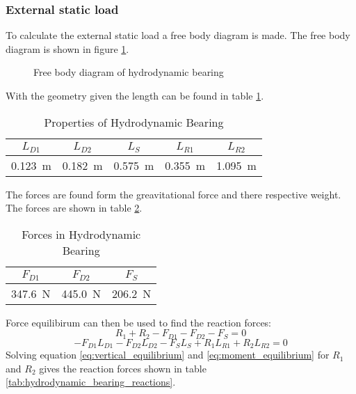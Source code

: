 \subsubsection{External static load}
To calculate the external static load a free body diagram is made. The free body diagram is shown in figure \ref{fig:free_body_diagram}.
\begin{figure}[ht]
    \centering
    
    \caption{Free body diagram of hydrodynamic bearing}
    \label{fig:free_body_diagram}
\end{figure}
With the geometry given the length can be found in table \ref{tab:hydrodynamic_bearing_properties}.
\begin{table}[ht]
    \centering
    \caption{Properties of Hydrodynamic Bearing}
    \label{tab:hydrodynamic_bearing_properties}
    \begin{tabular}{@{}ccccc@{}}
        \toprule
        $L_{D1}$    &   $L_{D2}$    &   $L_S$   &   $L_{R1}$   &   $L_{R2}$   \\ \midrule
        \SI{0.123}{\meter}  &   \SI{0.182}{\meter}  &   \SI{0.575}{\meter}   &   \SI{0.355}{\meter}   &   \SI{1.095}{\meter}   \\ \bottomrule
    \end{tabular}
\end{table}
The forces are found form the greavitational force and there respective weight. The forces are shown in table \ref{tab:hydrodynamic_bearing_forces}.
\begin{table}[ht]
    \centering
    \caption{Forces in Hydrodynamic Bearing}
    \label{tab:hydrodynamic_bearing_forces}
    \begin{tabular}{@{}ccc@{}}
        \toprule
        $F_{D1}$    &   $F_{D2}$    &   $F_S$   \\ \midrule
        \SI{347.6}{\newton}  &   \SI{445.0}{\newton}  &   \SI{206.2}{\newton}   \\ \bottomrule
    \end{tabular}
\end{table}
Force equilibirum can then be used to find the reaction forces:
\begin{equation}
    R_1 + R_2 - F_{D1} - F_{D2} - F_S = 0
    \label{eq:vertical_equilibrium}
\end{equation}
\begin{equation}
    -F_{D1} L_{D1} - F_{D2} L_{D2} - F_S L_S + R_1 L_{R1} + R_2 L_{R2} = 0
    \label{eq:moment_equilibrium}
\end{equation}
Solving equation \ref{eq:vertical_equilibrium} and \ref{eq:moment_equilibrium} for $R_1$ and $R_2$ gives the reaction forces shown in table \ref{tab:hydrodynamic_bearing_reactions}.
